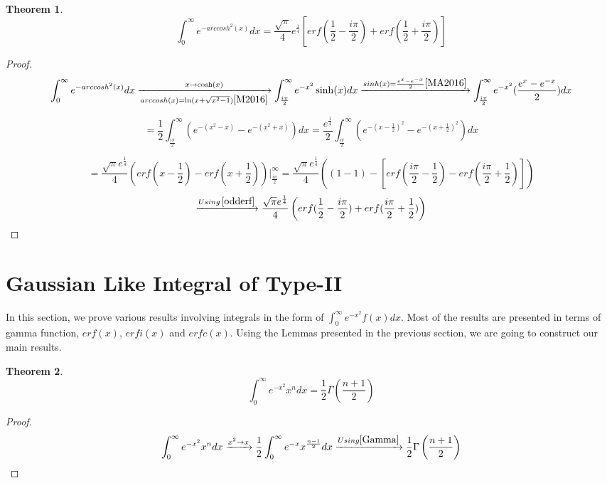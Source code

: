 \documentclass[a4paper,twoside,10pt]{article}
\newtheorem{theorem}{Theorem}[section]
\begin{document}
 \begin{theorem}
\begin{equation}\label{arccosheqn}
\int_0^{\infty} e^{-arccosh^2(x)} dx = \frac{\sqrt{\pi}}{4} e^{\frac{1}{4}} \left[ erf(\frac{1}{2}-\frac{i \pi}{2}) + erf(\frac{1}{2}+\frac{i \pi}{2}) \right]     
\end{equation}
\end{theorem}
\begin{proof}
\[ \int_0^{\infty} e^{-arccosh^2(x)} dx \xrightarrow[arccosh(x)=\ln(x+\sqrt{x^2-1}) \cite{M2016}]{x\rightarrow \cosh(x)} \int_{\frac{i \pi}{2}}^{\infty} e^{-x^2} \sinh(x) dx \xrightarrow{sinh(x)=\frac{e^x-e^{-x}}{2} \cite{MA2016}}  \int_{\frac{i\pi}{2}}^{\infty} e^{-x^2}(\frac{e^{x}-e^{-x}}{2}) dx  \]

\[=\frac{1}{2} \int_{\frac{i\pi}{2}}^{ \infty} \left( e^{-(x^2-x)}- e^{-(x^2+x)} \right) dx = \frac{e^{\frac{1}{4}}}{2} \int_{\frac{i\pi}{2}}^{ \infty} \left( e^{-(x-\frac{1}{2})^2}- e^{-(x+\frac{1}{2})^2} \right) dx \]

\[ =\frac{\sqrt{\pi}e^{\frac{1}{4}}}{4}  \left( erf(x-\frac{1}{2}) - erf(x+\frac{1}{2}) \right) \Big|_{\frac{i\pi}{2}}^{\infty} = \frac{\sqrt{\pi} e^{\frac{1}{4}} }{4}  \left( (1-1)-[erf(\frac{i\pi}{2}-\frac{1}{2})-erf(\frac{i\pi}{2}+\frac{1}{2})] \right) \]
\[ \xrightarrow{Using \, \eqref{odderf}} \frac{\sqrt{\pi} e^{\frac{1}{4}} }{4}  \left(erf(\frac{1}{2}-\frac{i \pi}{2})+erf(\frac{i\pi}{2}+\frac{1}{2}) \right)   \]
\end{proof}
\section{Gaussian Like Integral of Type-II}
In this section, we prove various results involving integrals in the form of   $\int_0^{\infty} e^{-x^2}f(x) dx  $. Most of the results are presented in terms of gamma function, $erf(x)$, $erfi(x)$ and $erfc(x)$. Using the Lemmas presented in the previous section, we are going to construct our main results. 

 \begin{theorem}
\begin{equation}
  \int_0^{\infty} e^{-x^2} x^n dx = \frac{1}{2}\Gamma(\frac{n+1}{2})   
\end{equation}
\end{theorem}
\begin{proof}
 \[ \int_0^{\infty} e^{-x^2} x^n dx \xrightarrow{x^2 \rightarrow x} \frac{1}{2}\int_0^{\infty} e^{-x}x^{\frac{n-1}{2}} dx  \xrightarrow{Using  \eqref{Gamma}} \frac{1}{2} \Gamma\left(\frac{n+1}{2}\right)  \]
\end{proof}
\end{document}
